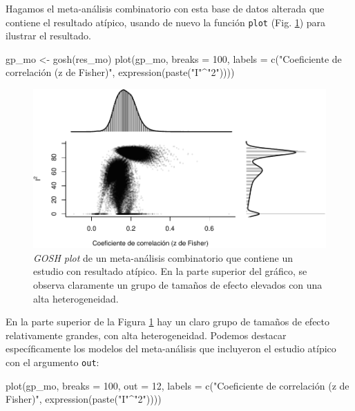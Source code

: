 \documentclass[
  bookmarksnumbered]{article}
\newenvironment{Shaded}{\begin{snugshade}}{\end{snugshade}}
\newcommand{\AttributeTok}[1]{\textcolor[rgb]{0.00,0.34,0.68}{#1}}
\newcommand{\DecValTok}[1]{\textcolor[rgb]{0.69,0.50,0.00}{#1}}
\newcommand{\FunctionTok}[1]{\textcolor[rgb]{0.39,0.29,0.61}{#1}}
\newcommand{\NormalTok}[1]{\textcolor[rgb]{0.12,0.11,0.11}{#1}}
\newcommand{\OtherTok}[1]{\textcolor[rgb]{0.00,0.43,0.16}{#1}}
\newcommand{\SpecialCharTok}[1]{\textcolor[rgb]{0.24,0.68,0.91}{#1}}
\newcommand{\StringTok}[1]{\textcolor[rgb]{0.75,0.01,0.01}{#1}}
\begin{document}
Hagamos el meta-análisis combinatorio con esta base de datos alterada que contiene el resultado atípico, usando de nuevo la función \texttt{plot} (Fig. \ref{fig:gosh2}) para ilustrar el resultado.

\begin{Shaded}
\begin{Highlighting}[]
\NormalTok{gp\_mo }\OtherTok{\textless{}{-}} \FunctionTok{gosh}\NormalTok{(res\_mo)}
\FunctionTok{plot}\NormalTok{(gp\_mo, }\AttributeTok{breaks =} \DecValTok{100}\NormalTok{,}
     \AttributeTok{labels =} \FunctionTok{c}\NormalTok{(}\StringTok{"Coeficiente de correlación (z de Fisher)"}\NormalTok{, }
                \FunctionTok{expression}\NormalTok{(}\FunctionTok{paste}\NormalTok{(}\StringTok{"I"}\SpecialCharTok{\^{}}\StringTok{"2"}\NormalTok{))))}
\end{Highlighting}
\end{Shaded}

\begin{figure}
\centering
\includegraphics{Meta-analysis_files/figure-latex/gosh2-1.pdf}
\caption{\label{fig:gosh2}\emph{GOSH plot} de un meta-análisis combinatorio que contiene un estudio con resultado atípico. En la parte superior del gráfico, se observa claramente un grupo de tamaños de efecto elevados con una alta heterogeneidad.}
\end{figure}

En la parte superior de la Figura \ref{fig:gosh2} hay un claro grupo de tamaños de efecto relativamente grandes, con alta heterogeneidad. Podemos destacar específicamente los modelos del meta-análisis que incluyeron el estudio atípico con el argumento \texttt{out}:

\begin{Shaded}
\begin{Highlighting}[]
\FunctionTok{plot}\NormalTok{(gp\_mo, }\AttributeTok{breaks =} \DecValTok{100}\NormalTok{, }\AttributeTok{out =} \DecValTok{12}\NormalTok{,}
     \AttributeTok{labels =} \FunctionTok{c}\NormalTok{(}\StringTok{"Coeficiente de correlación (z de Fisher)"}\NormalTok{, }
                \FunctionTok{expression}\NormalTok{(}\FunctionTok{paste}\NormalTok{(}\StringTok{"I"}\SpecialCharTok{\^{}}\StringTok{"2"}\NormalTok{))))}
\end{Highlighting}
\end{Shaded}
\end{document}
